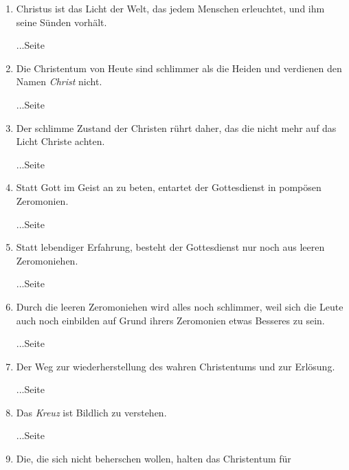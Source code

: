 \begin{enumerate}
\begin{flushright}
\pageref{ref:02_02_kein_gefallen_am_tod}\end{flushright}
 \item Christus ist das Licht der Welt, das jedem Menschen erleuchtet, und ihm
seine Sünden vorhält.
 \begin{flushright}...Seite \pageref{ref:02_03_gott_in_jedem}\end{flushright}
 \item Die Christentum von Heute sind schlimmer als die Heiden und verdienen den
Namen \textit{Christ} nicht.
 \begin{flushright}...Seite
\pageref{ref:02_08_schlimmer_als_heiden}\end{flushright}
 \item Der schlimme Zustand der Christen rührt daher, das die nicht mehr auf das
Licht Christe achten.
 \begin{flushright}...Seite
\pageref{ref:02_08_ursache_des_abfalls}\end{flushright}
 \item Statt Gott im Geist an zu beten, entartet der Gottesdienst in pompösen
Zeromonien.
 \begin{flushright}...Seite \pageref{ref:02_08_falscher_gottesdienst}
\end{flushright}
 \item Statt lebendiger Erfahrung, besteht der Gottesdienst nur noch aus leeren
Zeromoniehen.
 \begin{flushright}...Seite
\pageref{ref:02_09_lebendige_erfahrung}\end{flushright}
 \item Durch die leeren Zeromoniehen wird alles noch schlimmer, weil sich die
Leute auch noch einbilden auf Grund ihrers Zeromonien etwas Besseres zu sein.
 \begin{flushright}...Seite
\pageref{ref:02_09_selbstueberschaetzung}\end{flushright}
 \item Der Weg zur wiederherstellung des wahren Christentums und zur Erlösung.
 \begin{flushright}...Seite \pageref{ref:02_10_abhilfe}\end{flushright}
 \item Das \textit{Kreuz} ist Bildlich zu verstehen.
 \begin{flushright}...Seite \pageref{ref:03_01_das_kreuz}\end{flushright}
 \item Die, die sich nicht beherschen wollen, halten das Christentum für

\end{enumerate}
